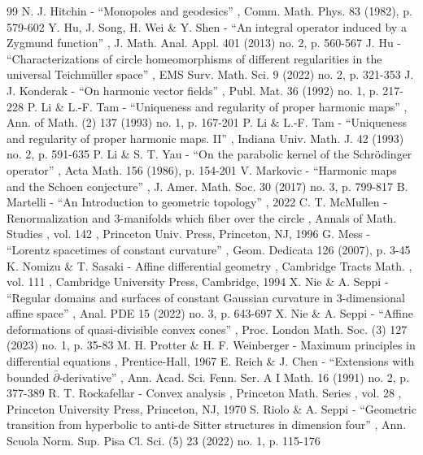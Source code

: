 \begin{thebibliography}{99}
 N. J. Hitchin - “Monopoles and geodesics” , Comm. Math. Phys. 83 (1982), p. 579-602
 Y. Hu, J. Song, H. Wei \& Y. Shen - “An integral operator induced by a Zygmund function” , J. Math. Anal. Appl. 401 (2013) no. 2, p. 560-567
 J. Hu - “Characterizations of circle homeomorphisms of different regularities in the universal Teichmüller space” , EMS Surv. Math. Sci. 9 (2022) no. 2, p. 321-353
 J. J. Konderak - “On harmonic vector fields” , Publ. Mat. 36 (1992) no. 1, p. 217-228
 P. Li \& L.-F. Tam - “Uniqueness and regularity of proper harmonic maps” , Ann. of Math. (2) 137 (1993) no. 1, p. 167-201
 P. Li \& L.-F. Tam - “Uniqueness and regularity of proper harmonic maps. II” , Indiana Univ. Math. J. 42 (1993) no. 2, p. 591-635
 P. Li \& S. T. Yau - “On the parabolic kernel of the Schrödinger operator” , Acta Math. 156 (1986), p. 154-201
 V. Markovic - “Harmonic maps and the Schoen conjecture” , J. Amer. Math. Soc. 30 (2017) no. 3, p. 799-817
 B. Martelli - “An Introduction to geometric topology” , 2022
 C. T. McMullen - Renormalization and $3$-manifolds which fiber over the circle , Annals of Math. Studies , vol. 142 , Princeton Univ. Press, Princeton, NJ, 1996
 G. Mess - “Lorentz spacetimes of constant curvature” , Geom. Dedicata 126 (2007), p. 3-45
 K. Nomizu \& T. Sasaki - Affine differential geometry , Cambridge Tracts Math. , vol. 111 , Cambridge University Press, Cambridge, 1994
 X. Nie \& A. Seppi - “Regular domains and surfaces of constant Gaussian curvature in $3$-dimensional affine space” , Anal. PDE 15 (2022) no. 3, p. 643-697
 X. Nie \& A. Seppi - “Affine deformations of quasi-divisible convex cones” , Proc. London Math. Soc. (3) 127 (2023) no. 1, p. 35-83
 M. H. Protter \& H. F. Weinberger - Maximum principles in differential equations , Prentice-Hall, 1967
 E. Reich \& J. Chen - “Extensions with bounded $\bar{\partial }$-derivative” , Ann. Acad. Sci. Fenn. Ser. A I Math. 16 (1991) no. 2, p. 377-389
 R. T. Rockafellar - Convex analysis , Princeton Math. Series , vol. 28 , Princeton University Press, Princeton, NJ, 1970
 S. Riolo \& A. Seppi - “Geometric transition from hyperbolic to anti-de Sitter structures in dimension four” , Ann. Scuola Norm. Sup. Pisa Cl. Sci. (5) 23 (2022) no. 1, p. 115-176

\end{thebibliography}
